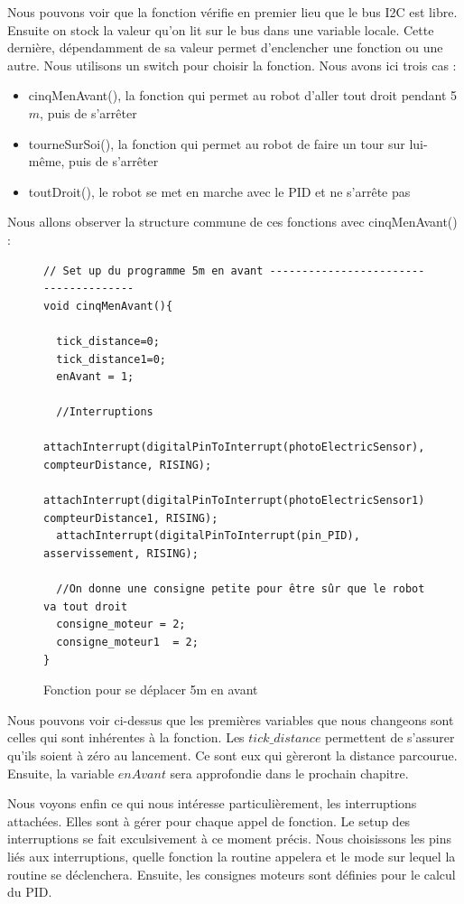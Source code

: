 \documentclass[
	a4paper,									%
	11pt,										%
	twoside,									%
	openright,									%
	notitlepage,									%
	parskip=half,								%
]{scrreprt}										%
\begin{document}
Nous pouvons voir que la fonction vérifie en premier lieu que le bus I2C est libre. Ensuite on stock la valeur 
qu'on lit sur le bus dans une variable locale. Cette dernière, dépendamment de sa valeur permet d'enclencher 
une fonction ou une autre. Nous utilisons un switch pour choisir la fonction. Nous avons ici trois cas :

\begin{itemize}
	\item cinqMenAvant(), la fonction qui permet au robot d'aller tout droit pendant 5$m$, puis de s'arrêter
 	\item tourneSurSoi(), la fonction qui permet au robot de faire un tour sur lui-même, puis de s'arrêter
  	\item toutDroit(), le robot se met en marche avec le PID et ne s'arrête pas
\end{itemize}

\noindent Nous allons observer la structure commune de ces fonctions avec cinqMenAvant() : 
\newpage
\begin{figure}[!ht]
	
	\begin{verbatim}
// Set up du programme 5m en avant --------------------------------------
void cinqMenAvant(){
  
  tick_distance=0;
  tick_distance1=0;
  enAvant = 1;

  //Interruptions 
  attachInterrupt(digitalPinToInterrupt(photoElectricSensor), compteurDistance, RISING);
  attachInterrupt(digitalPinToInterrupt(photoElectricSensor1), compteurDistance1, RISING);
  attachInterrupt(digitalPinToInterrupt(pin_PID), asservissement, RISING);

  //On donne une consigne petite pour être sûr que le robot va tout droit
  consigne_moteur = 2;
  consigne_moteur1  = 2;
}
	\end{verbatim}
	\caption{Fonction pour se déplacer 5m en avant}
	\label{cinqMenAvant}
	\end{figure}
Nous pouvons voir ci-dessus que les premières variables que nous changeons sont celles qui sont inhérentes
à la fonction. Les $tick\_distance$ permettent de s'assurer qu'ils soient à zéro au lancement. Ce sont eux qui gèreront
la distance parcourue. Ensuite, la variable $enAvant$ sera approfondie dans le prochain chapitre. \par

Nous voyons enfin ce qui nous intéresse particulièrement, les interruptions attachées. Elles sont à gérer pour
chaque appel de fonction. Le setup des interruptions se fait exculsivement à ce moment précis. Nous choisissons 
les pins liés aux interruptions, quelle fonction la routine appelera et le mode sur lequel la routine se déclenchera. 
Ensuite, les consignes moteurs sont définies pour le calcul du PID. \par
\end{document}
